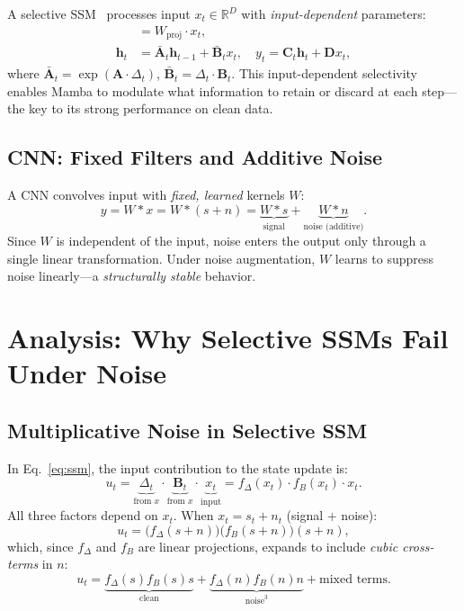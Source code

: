 \documentclass{Interspeech}
\begin{document}
A selective SSM~\cite{gu2024mamba} processes input $x_t \in \mathbb{R}^D$ with \emph{input-dependent} parameters:
\begin{align}
[\Delta_t, \mathbf{B}_t, \mathbf{C}_t] &= W_{\text{proj}} \cdot x_t, \label{eq:proj} \\
\mathbf{h}_t &= \bar{\mathbf{A}}_t \mathbf{h}_{t-1} + \bar{\mathbf{B}}_t x_t, \quad
y_t = \mathbf{C}_t \mathbf{h}_t + \mathbf{D} x_t, \label{eq:ssm}
\end{align}
where $\bar{\mathbf{A}}_t = \exp(\mathbf{A} \cdot \Delta_t)$, $\bar{\mathbf{B}}_t = \Delta_t \cdot \mathbf{B}_t$.
This input-dependent selectivity enables Mamba to modulate what information to retain or discard at each step---the key to its strong performance on clean data.

\subsection{CNN: Fixed Filters and Additive Noise}

A CNN convolves input with \emph{fixed, learned} kernels $W$:
\begin{equation}
y = W \ast x = W \ast (s + n) = \underbrace{W \ast s}_{\text{signal}} + \underbrace{W \ast n}_{\text{noise (additive)}}.
\label{eq:cnn}
\end{equation}
Since $W$ is independent of the input, noise enters the output only through a single linear transformation. Under noise augmentation, $W$ learns to suppress noise linearly---a \emph{structurally stable} behavior.

\section{Analysis: Why Selective SSMs Fail Under Noise}
\label{sec:analysis}

\subsection{Multiplicative Noise in Selective SSM}

In Eq.~\ref{eq:ssm}, the input contribution to the state update is:
\begin{equation}
u_t = \underbrace{\Delta_t}_{\text{from } x} \cdot \underbrace{\mathbf{B}_t}_{\text{from } x} \cdot \underbrace{x_t}_{\text{input}} = f_\Delta(x_t) \cdot f_B(x_t) \cdot x_t.
\label{eq:mult}
\end{equation}
All three factors depend on $x_t$. When $x_t = s_t + n_t$ (signal + noise):
\begin{equation}
u_t = \big(f_\Delta(s{+}n)\big) \big(f_B(s{+}n)\big) (s{+}n),
\end{equation}
which, since $f_\Delta$ and $f_B$ are linear projections, expands to include \emph{cubic cross-terms} in $n$:
\begin{equation}
u_t = \underbrace{f_\Delta(s) f_B(s) s}_{\text{clean}} + \underbrace{f_\Delta(n) f_B(n) n}_{\text{noise}^3} + \text{mixed terms}.
\label{eq:cubic}
\end{equation}
\end{document}
